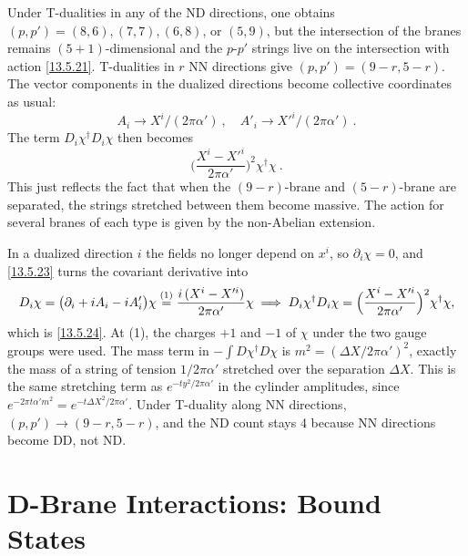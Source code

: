 Under T-dualities in any of the ND directions, one obtains $(p, p') = (8,6), (7,7), (6,8)$, or $(5,9)$, but the intersection of the branes remains $(5+1)$-dimensional and the $p$-$p'$ strings live on the intersection with action \eqref{13.5.21}. T-dualities in $r$ NN directions give $(p, p') = (9-r, 5-r)$. The vector components in the dualized directions become collective coordinates as usual:
\begin{equation}
	A_i \longrightarrow X^i/(2\pi\alpha') \:, \quad A'_i \longrightarrow X'^i/(2\pi\alpha') \:. \label{13.5.23}
\end{equation}
The term $D_i\chi^\dagger D_i\chi$ then becomes
\begin{equation}
	\biggl(\frac{X^i - X'^i}{2\pi\alpha'}\biggr)^2\chi^\dagger\chi \:. \label{13.5.24}
\end{equation}
This just reflects the fact that when the $(9-r)$-brane and $(5-r)$-brane are separated, the strings stretched between them become massive. The action for several branes of each type is given by the non-Abelian extension.
\begin{tcolorbox}[breakable]
	\begin{remark}
		In a dualized direction $i$ the fields no longer depend on $x^i$, so $\partial_i\chi=0$, and \eqref{13.5.23} turns the covariant derivative into
		\begin{align*}
			D_i\chi = \bigl(\partial_i+i A_i-i A'_i\bigr)\chi \overset{(1)}{=} \frac{i\,(X^i-X'^i)}{2\pi\alpha'}\chi
			\;\Longrightarrow\; D_i\chi^\dagger D_i\chi = \Bigl(\frac{X^i-X'^i}{2\pi\alpha'}\Bigr)^2\chi^\dagger\chi ,
		\end{align*}
		which is \eqref{13.5.24}. At (1), the charges $+1$ and $-1$ of $\chi$ under the two gauge groups were used. The mass term in $-\int D\chi^\dagger D\chi$ is $m^2=(\Delta X/2\pi\alpha')^2$, exactly the mass of a string of tension $1/2\pi\alpha'$ stretched over the separation $\Delta X$. This is the same stretching term as $e^{-ty^2/2\pi\alpha'}$ in the cylinder amplitudes, since $e^{-2\pi t\alpha'm^2}=e^{-t\Delta X^2/2\pi\alpha'}$. Under T-duality along NN directions, $(p,p')\to(9-r,5-r)$, and the ND count stays 4 because NN directions become DD, not ND.
	\end{remark}
\end{tcolorbox}


\section{D-Brane Interactions: Bound States}

